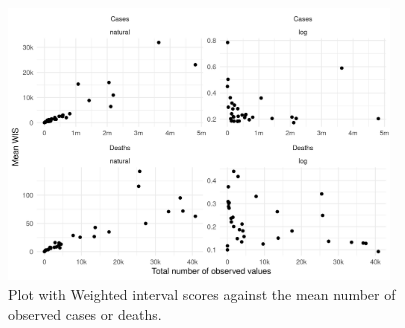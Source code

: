 \documentclass{article}
\begin{document}
\begin{figure}[h!]
    \centering
    \includegraphics[width=0.9\textwidth]{output/figures/HUB-mean-scores-vs-total.png}
    \caption{Plot with Weighted interval scores against the mean number of observed cases or deaths.}
    \label{fig:HUB-mean-scores-total}
\end{figure}
\end{document}
